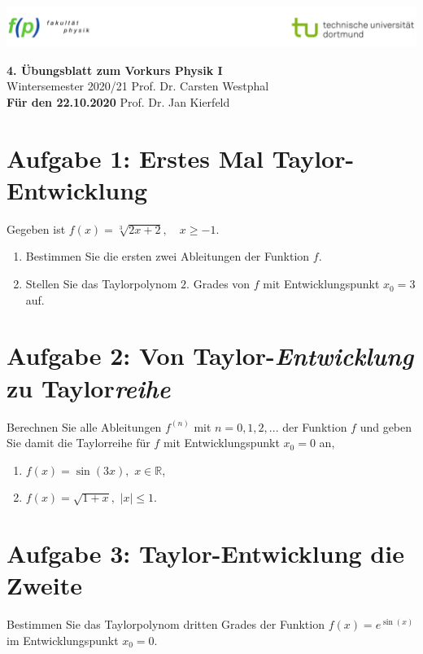 \documentclass[11pt,a4paper, parskip=half ]{report}
\newcommand{\GrosserAbstand}{\\[12pt]}
\begin{document}
\includegraphics[width=\textwidth]{logo_tu_fp.png}
\begin{center}
\Large{\textbf{4. \"Ubungsblatt zum Vorkurs Physik I}}
\GrosserAbstand
\normalsize
Wintersemester 2020/21 \hfill Prof. Dr. Carsten Westphal\\
\textbf{Für den 22.10.2020} \hfill Prof. Dr. Jan Kierfeld \\
\end{center}

%
%
%
%

\section*{Aufgabe 1: Erstes Mal Taylor-Entwicklung}
  Gegeben ist $f(x) = \sqrt[3]{2x + 2}, \quad x \geq -1$.
  \begin{enumerate}
    \item Bestimmen Sie die ersten zwei Ableitungen der Funktion $f$.
    \item Stellen Sie das Taylorpolynom $2.$ Grades von $f$ mit Entwicklungspunkt $x_0 = 3$ auf.
  \end{enumerate}

  \section*{Aufgabe 2: Von Taylor-\textit{Entwicklung} zu Taylor\textit{reihe}}
  Berechnen Sie alle Ableitungen $f^{(n)}$ mit $n = 0, 1, 2, ...$ der Funktion $f$ und geben Sie damit die Taylorreihe für $f$ mit Entwicklungspunkt $x_0 = 0$ an,  
  \begin{enumerate}
    \item $f(x) = \sin(3x), \,\, x \in \mathbb{R}$, 
    \item $f(x) = \sqrt{1+x}, \,\,|x| \leq 1$.
  \end{enumerate}

  \section*{Aufgabe 3: Taylor-Entwicklung die Zweite}
  Bestimmen Sie das Taylorpolynom dritten Grades der Funktion $f(x) = e^{\sin(x)}$ im Entwicklungspunkt $x_0 = 0$.   
\end{document}
